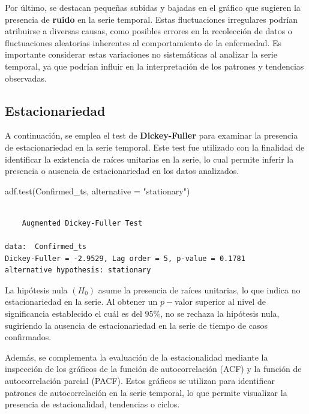\documentclass[
  letterpaper,
  DIV=11,
  numbers=noendperiod]{scrreport}
\newenvironment{Shaded}{\begin{snugshade}}{\end{snugshade}}
\newcommand{\AttributeTok}[1]{\textcolor[rgb]{0.40,0.45,0.13}{#1}}
\newcommand{\FunctionTok}[1]{\textcolor[rgb]{0.28,0.35,0.67}{#1}}
\newcommand{\NormalTok}[1]{\textcolor[rgb]{0.00,0.23,0.31}{#1}}
\newcommand{\StringTok}[1]{\textcolor[rgb]{0.13,0.47,0.30}{#1}}
\theoremstyle{plain}
\theoremstyle{definition}
\theoremstyle{definition}
\theoremstyle{plain}
\theoremstyle{remark}
\begin{document}
Por último, se destacan pequeñas subidas y bajadas en el gráfico que
sugieren la presencia de \textbf{ruido} en la serie temporal. Estas
fluctuaciones irregulares podrían atribuirse a diversas causas, como
posibles errores en la recolección de datos o fluctuaciones aleatorias
inherentes al comportamiento de la enfermedad. Es importante considerar
estas variaciones no sistemáticas al analizar la serie temporal, ya que
podrían influir en la interpretación de los patrones y tendencias
observadas.

\subsection{Estacionariedad}\label{estacionariedad}

A continuación, se emplea el test de \textbf{Dickey-Fuller} para
examinar la presencia de estacionariedad en la serie temporal. Este test
fue utilizado con la finalidad de identificar la existencia de raíces
unitarias en la serie, lo cual permite inferir la presencia o ausencia
de estacionariedad en los datos analizados.

\begin{Shaded}
\begin{Highlighting}[]
\FunctionTok{adf.test}\NormalTok{(Confirmed\_ts, }\AttributeTok{alternative =} \StringTok{"stationary"}\NormalTok{)}
\end{Highlighting}
\end{Shaded}

\begin{verbatim}

    Augmented Dickey-Fuller Test

data:  Confirmed_ts
Dickey-Fuller = -2.9529, Lag order = 5, p-value = 0.1781
alternative hypothesis: stationary
\end{verbatim}

La hipótesis nula \((H_0)\) asume la presencia de raíces unitarias, lo
que indica no estacionariedad en la serie. Al obtener un \(p-\)valor
superior al nivel de significancia establecido el cuál es del \(95\%\),
no se rechaza la hipótesis nula, sugiriendo la ausencia de
estacionariedad en la serie de tiempo de casos confirmados.

Además, se complementa la evaluación de la estacionalidad mediante la
inspección de los gráficos de la función de autocorrelación (ACF) y la
función de autocorrelación parcial (PACF). Estos gráficos se utilizan
para identificar patrones de autocorrelación en la serie temporal, lo
que permite visualizar la presencia de estacionalidad, tendencias o
ciclos.
\end{document}
